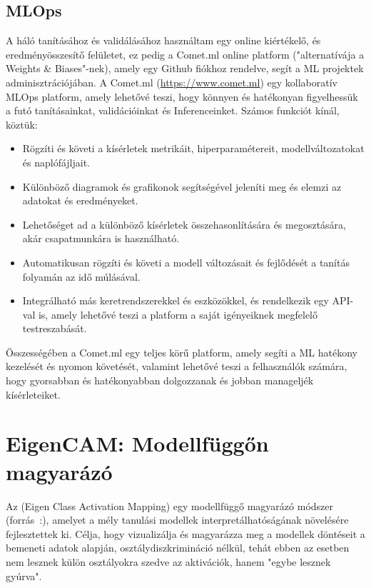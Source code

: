 \documentclass[12pt,oneside,a4paper]{article}
\newcommand{\newsection}[1]{\clearpage\section{#1}}\label{makro}
\theoremstyle{remark}
\newtheorem*{observation}{ \newline \textit}
\begin{document}
\subsection{MLOps}\label{subsec:mlops}
A háló tanításához és validálásához használtam egy online kiértékelő, és eredményösszesítő felületet, ez pedig a Comet.ml online platform ("alternatívája a Weights \& Biases"-nek), amely egy Github fiókhoz rendelve, segít a \ac{ML} projektek adminisztrációjában.
A Comet.ml (\url{https://www.comet.ml}) egy kollaboratív \ac{MLOps} platform, amely lehetővé teszi, hogy könnyen és
    hatékonyan figyelhessük a futó tanításainkat, validációinkat és \gls{Inference}inket.
    Számos funkciót kínál, köztük:
    \begin{itemize}
        \item Rögzíti és követi a kísérletek metrikáit, hiperparamétereit, modellváltozatokat és naplófájljait.
        \item Különböző diagramok és grafikonok segítségével jeleníti meg és elemzi az adatokat és eredményeket.
        \item Lehetőséget ad a különböző kísérletek összehasonlítására és megosztására, akár csapatmunkára is használható.
        \item  Automatikusan rögzíti és követi a modell változásait és fejlődését a tanítás folyamán az idő múlásával.
        \item Integrálható más keretrendszerekkel és eszközökkel, és rendelkezik egy API-val is, amely lehetővé teszi a platform
            a saját igényeiknek megfelelő testreszabását.
    \end{itemize}
    \begin{observation}
        Összességében a Comet.ml egy teljes körű platform, amely segíti a \ac{ML} hatékony kezelését
        és nyomon követését, valamint lehetővé teszi a felhasználók számára, hogy gyorsabban és hatékonyabban dolgozzanak és jobban manageljék
        kísérleteiket.
    \end{observation}

\newsection{EigenCAM: Modellfüggőn magyarázó}\label{sec:eigencam:-modellfuggo-magyarazo}
     Az  (Eigen Class Activation Mapping) egy modellfüggő magyarázó módszer (forrás~\cite{pytorch-grad-cam}:), amelyet a mély tanulási
     modellek interpretálhatóságának növelésére fejlesztettek ki.
     Célja, hogy vizualizálja és magyarázza meg a modellek döntéseit a bemeneti adatok alapján,
     osztálydiszkrimináció nélkül, tehát ebben az esetben nem lesznek külön osztályokra szedve az aktivációk, hanem "egybe lesznek gyúrva".
\end{document}

